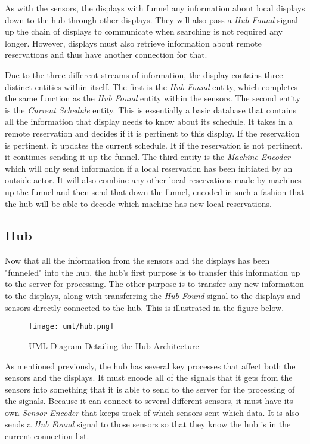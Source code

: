 \documentclass[PPFS.tex]{template/subfiles}
\begin{document}
As with the sensors, the displays with funnel any information about local displays down to the hub through other displays. They will also pass a \textit{Hub Found} signal up the chain of displays to communicate when searching is not required any longer. However, displays must also retrieve information about remote reservations and thus have another connection for that.

Due to the three different streams of information, the display contains three distinct entities within itself. The first is the \textit{Hub Found} entity, which completes the same function as the \textit{Hub Found} entity within the sensors. The second entity is the \textit{Current Schedule} entity. This is essentially a basic database that contains all the information that display needs to know about its schedule. It takes in a remote reservation and decides if it is pertinent to this display. If the reservation is pertinent, it updates the current schedule. It if the reservation is not pertinent, it continues sending it up the funnel. The third entity is the \textit{Machine Encoder} which will only send information if a local reservation has been initiated by an outside actor. It will also combine any other local reservations made by machines up the funnel and then send that down the funnel, encoded in such a fashion that the hub will be able to decode which machine has new local reservations.

\subsection{Hub}

Now that all the information from the sensors and the displays has been "funneled" into the hub, the hub's first purpose is to transfer this information up to the server for processing. The other purpose is to transfer any new information to the displays, along with transferring the \textit{Hub Found} signal to the displays and sensors directly connected to the hub. This is illustrated in the figure below.

\begin{figure}[H]
    \centering
    \texttt{[image: uml/hub.png]}
    \caption{UML Diagram Detailing the Hub Architecture}
\end{figure}

As mentioned previously, the hub has several key processes that affect both the sensors and the displays. It must encode all of the signals that it gets from the sensors into something that it is able to send to the server for the processing of the signals. Because it can connect to several different sensors, it must have its own \textit{Sensor Encoder} that keeps track of which sensors sent which data. It is also sends a \textit{Hub Found} signal to those sensors so that they know the hub is in the current connection list.
\end{document}
